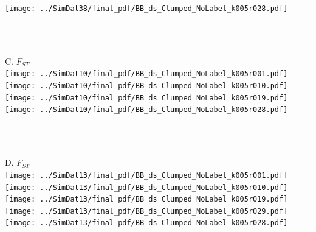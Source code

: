 \documentclass[varwidth=true, border={80, 10}]{standalone}
\newlength{\nameraise}
\newlength{\nameoverhang}
\begin{document}
\texttt{[image: ../SimDat38/final\_pdf/BB\_ds\_Clumped\_NoLabel\_k005r028.pdf]}~\hspace*{-\nameoverhang}\raisebox{\nameraise}{FLOCKTURE (9/9)} \\
\noindent\rule[.5cm]{8.2in}{0.4pt}\\
\vspace{-2.5em}\\
C. $F_{ST}$ = \\
\texttt{[image: ../SimDat10/final\_pdf/BB\_ds\_Clumped\_NoLabel\_k005r001.pdf]}~\hspace*{-\nameoverhang}\raisebox{\nameraise}{STRUCTURE A.C (9/9)} \\
\texttt{[image: ../SimDat10/final\_pdf/BB\_ds\_Clumped\_NoLabel\_k005r010.pdf]}~\hspace*{-\nameoverhang}\raisebox{\nameraise}{STRUCTURE NA.C (9/9)} \\
\texttt{[image: ../SimDat10/final\_pdf/BB\_ds\_Clumped\_NoLabel\_k005r019.pdf]}~\hspace*{-\nameoverhang}\raisebox{\nameraise}{STRUCTURE NA.NC  (9/9)} \\
\texttt{[image: ../SimDat10/final\_pdf/BB\_ds\_Clumped\_NoLabel\_k005r028.pdf]}~\hspace*{-\nameoverhang}\raisebox{\nameraise}{FLOCKTURE (9/9)} \\
\noindent\rule[.5cm]{8.2in}{0.4pt}\\
\vspace{-2.5em}\\
D. $F_{ST}$ = \\
\texttt{[image: ../SimDat13/final\_pdf/BB\_ds\_Clumped\_NoLabel\_k005r001.pdf]}~\hspace*{-\nameoverhang}\raisebox{\nameraise}{STRUCTURE A.C (9/9)} \\
\texttt{[image: ../SimDat13/final\_pdf/BB\_ds\_Clumped\_NoLabel\_k005r010.pdf]}~\hspace*{-\nameoverhang}\raisebox{\nameraise}{STRUCTURE NA.C (9/9)} \\
\texttt{[image: ../SimDat13/final\_pdf/BB\_ds\_Clumped\_NoLabel\_k005r019.pdf]}~\hspace*{-\nameoverhang}\raisebox{\nameraise}{STRUCTURE NA.NC  (9/9)} \\
\texttt{[image: ../SimDat13/final\_pdf/BB\_ds\_Clumped\_NoLabel\_k005r029.pdf]}~\hspace*{-\nameoverhang}\raisebox{\nameraise}{FLOCKTURE (6/9)} \\
\texttt{[image: ../SimDat13/final\_pdf/BB\_ds\_Clumped\_NoLabel\_k005r028.pdf]}~\hspace*{-\nameoverhang}\raisebox{\nameraise}{FLOCKTURE (1/9)} \\
\end{document}
